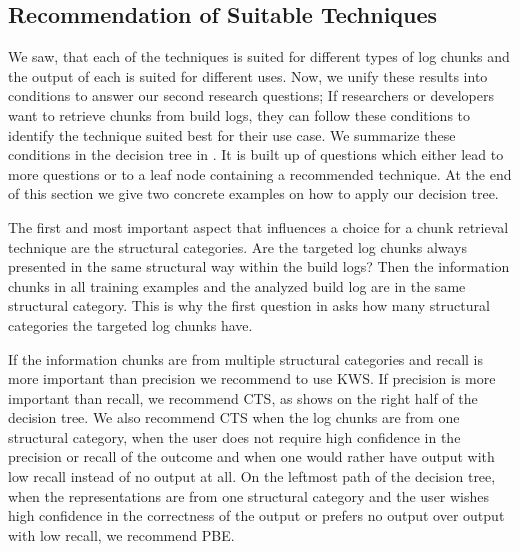 \subsection{Recommendation of Suitable Techniques}
We saw, that each of the techniques is suited for different types of
log chunks and the output of each is suited for different uses.
Now, we unify these results into conditions to answer
our second research questions;
If researchers or developers want to retrieve chunks from build logs,
they can follow these conditions to identify the technique
suited best for their use case.
We summarize these conditions in the decision tree in
.
It is built up of questions
which either lead to more questions or to a leaf node containing a
recommended technique.
At the end of this section we give two concrete examples on how to
apply our decision tree.



The first and most important aspect that influences a choice for
a chunk retrieval technique are the structural categories.
Are the targeted log chunks always presented in
the same structural way within the build logs? Then the information
chunks in all training examples and the analyzed build log are in the
same structural category.
This is why the first question in  asks
how many structural categories the targeted log chunks have.

If the information chunks are from multiple structural categories
and recall is more important than precision we recommend
to use KWS\@.
If precision is more important than recall, we
recommend CTS, as  shows on the
right half of the decision tree.
We also recommend CTS when the log chunks are
from one structural category, when the user does not require high
confidence in the precision or recall of the outcome and when one
would rather have output with low recall instead of no output at all.
On the leftmost path of the decision tree,
when the representations are from one structural category and the user
wishes high confidence in the correctness of the output or prefers
no output over output with low recall, we recommend PBE\@.

